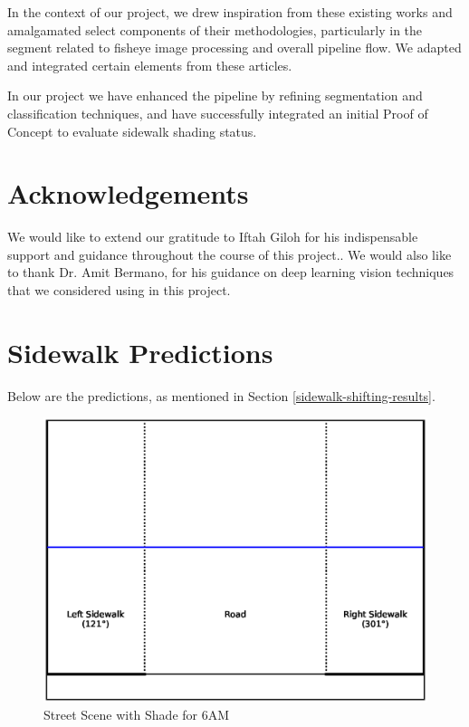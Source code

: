 \documentclass[nohyperref]{article}
\theoremstyle{plain}
\theoremstyle{definition}
\theoremstyle{remark}
\begin{document}
In the context of our project, we drew inspiration from these existing works and amalgamated select components of their methodologies, particularly in the segment related to fisheye image processing and overall pipeline flow. We adapted and integrated certain elements from these articles.

In our project we have enhanced the pipeline by refining segmentation and classification techniques, and have successfully integrated an initial Proof of Concept to evaluate sidewalk shading status.

\section{Acknowledgements}
\label{acknowledgements}
We would like to extend our gratitude to Iftah Giloh for his indispensable support and guidance throughout the course of this project.. We would also like to thank Dr. Amit Bermano, for his guidance on deep learning vision techniques that we considered using in this project.




\newpage
\appendix
\section{Sidewalk Predictions}
\label{sidewalk-predictions}
Below are the predictions, as mentioned in Section \ref{sidewalk-shifting-results}.

\begin{figure}[ht]
\begin{center}
\centerline{\includegraphics[width=\columnwidth]{sidewalk_predictions/shade_at_6}}
\caption{Street Scene with Shade for 6AM}
\end{center}
\end{figure}
\end{document}
